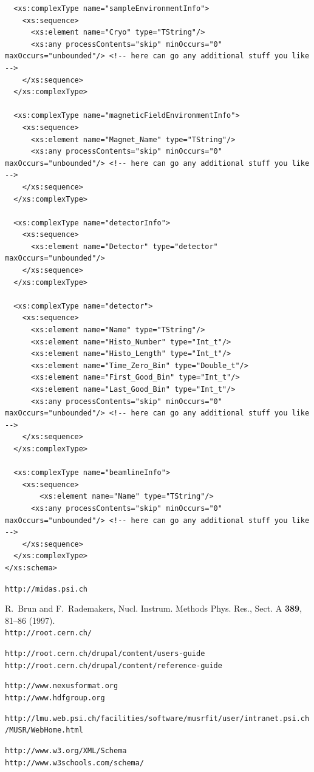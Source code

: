 \documentclass[twoside]{article}
\begin{document}
\begin{shaded}
\begin{small}
\begin{verbatim}
  <xs:complexType name="sampleEnvironmentInfo">
    <xs:sequence>
      <xs:element name="Cryo" type="TString"/>
      <xs:any processContents="skip" minOccurs="0" maxOccurs="unbounded"/> <!-- here can go any additional stuff you like -->          
    </xs:sequence>
  </xs:complexType>
  
  <xs:complexType name="magneticFieldEnvironmentInfo">
    <xs:sequence>
      <xs:element name="Magnet_Name" type="TString"/>
      <xs:any processContents="skip" minOccurs="0" maxOccurs="unbounded"/> <!-- here can go any additional stuff you like -->          
    </xs:sequence>
  </xs:complexType>

  <xs:complexType name="detectorInfo">
    <xs:sequence>
      <xs:element name="Detector" type="detector" maxOccurs="unbounded"/>
    </xs:sequence>
  </xs:complexType>
  
  <xs:complexType name="detector">
    <xs:sequence>
      <xs:element name="Name" type="TString"/>
      <xs:element name="Histo_Number" type="Int_t"/>
      <xs:element name="Histo_Length" type="Int_t"/>
      <xs:element name="Time_Zero_Bin" type="Double_t"/>
      <xs:element name="First_Good_Bin" type="Int_t"/>
      <xs:element name="Last_Good_Bin" type="Int_t"/>
      <xs:any processContents="skip" minOccurs="0" maxOccurs="unbounded"/> <!-- here can go any additional stuff you like -->      
    </xs:sequence>
  </xs:complexType>
  
  <xs:complexType name="beamlineInfo">
    <xs:sequence>
    	<xs:element name="Name" type="TString"/>
      <xs:any processContents="skip" minOccurs="0" maxOccurs="unbounded"/> <!-- here can go any additional stuff you like -->          
    </xs:sequence>
  </xs:complexType>
</xs:schema>
\end{verbatim}
\end{small}
\end{shaded}

\begin{thebibliography}{10}
\texttt{http://midas.psi.ch}

R.~Brun and F.~Rademakers, Nucl. Instrum. Methods Phys. Res., Sect. A {\bf{389}}, 81--86 (1997).\\
\texttt{http://root.cern.ch/}

\texttt{http://root.cern.ch/drupal/content/users-guide}\\
\texttt{http://root.cern.ch/drupal/content/reference-guide}

\texttt{http://www.nexusformat.org} \\
\texttt{http://www.hdfgroup.org}

\texttt{http://lmu.web.psi.ch/facilities/software/musrfit/user/intranet.psi.ch/MUSR/WebHome.html}

\texttt{http://www.w3.org/XML/Schema} \\
\texttt{http://www.w3schools.com/schema/}

\end{thebibliography}
\end{document}
